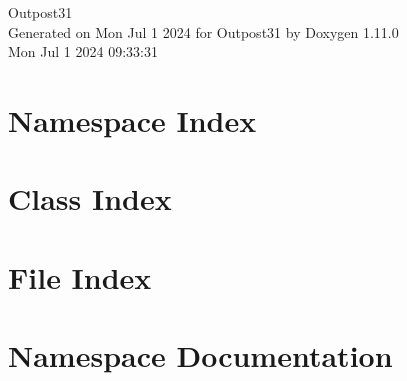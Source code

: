 \documentclass[twoside]{book}
\newcommand{\+}{\discretionary{\mbox{\scriptsize$\hookleftarrow$}}{}{}}
\newcommand{\clearemptydoublepage}{%
    \newpage{\pagestyle{empty}\cleardoublepage}%
  }
\begin{document}
  \raggedbottom
    \hypersetup{pageanchor=false,
                bookmarksnumbered=true,
                pdfencoding=unicode
               }
  \begin{titlepage}
  \vspace*{7cm}
  \begin{center}%
  {\Large Outpost31}\\
  \vspace*{1cm}
  {\large Generated on Mon Jul 1 2024 for Outpost31 by Doxygen 1.11.0}\\
    \vspace*{0.5cm}
    {\small Mon Jul 1 2024 09:33:31}
  \end{center}
  \end{titlepage}
  \clearemptydoublepage
  \tableofcontents
  \clearemptydoublepage
  \hypersetup{pageanchor=true}

\chapter{Namespace Index}

\chapter{Class Index}

\chapter{File Index}

\chapter{Namespace Documentation}


















\end{document}
